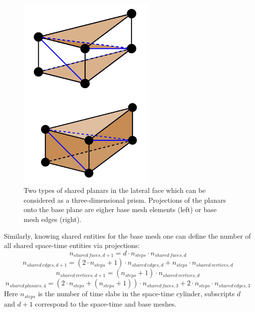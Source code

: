 \documentclass[12pt]{article}
\begin{document}
\begin{figure}[h]
\begin{minipage}{0.5\textwidth}
\centering
\includegraphics[width = 0.6\textwidth]{planars1_prism.png}
\end{minipage}
\hfill
\begin{minipage}{0.5\textwidth}
\centering
\includegraphics[width = 0.6\textwidth]{planars2_prism.png}
\end{minipage}
\caption{Two types of shared planars in the lateral face which can be considered as a three-dimensional prism. Projections of the planars onto the base plane are eigher base mesh elements (left) or base mesh edges (right).}
\end{figure}


Similarly, knowing shared entities for the base mesh one can define the number of all shared space-time entities via projections:
$$
n_{shared \, faces, d+1} = d \cdot n_{steps} \cdot n_{shared \, faces, d}
$$
$$
n_{shared \, edges, d+1} = (2 \cdot n_{steps} + 1 ) \cdot n_{shared \, edges, d} + n_{steps} \cdot n_{shared \, vertices, d}
$$
$$
n_{shared \, vertices, d+1} = (n_{steps} + 1) \cdot n_{shared \, vertices, d}
$$
$$
n_{shared \, planars, 4} = (2 \cdot n_{steps} + (n_{steps} + 1)) \cdot n_{shared \, faces, 3} + 2 \cdot n_{steps} \cdot n_{shared \, edges, 3}
$$
Here $n_{steps}$ is the number of time slabs in the space-time cylinder, subscripts $d$ and $d+1$ correspond to the space-time and base meshes.
\end{document}
